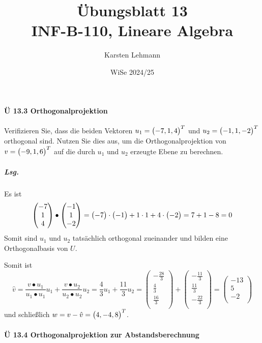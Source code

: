 \documentclass{scrreprt}
\author{Karsten Lehmann}
\date{WiSe 2024/25}
\title{Übungsblatt 13\\INF-B-110, Lineare Algebra}
\begin{document}
\paragraph{Ü 13.3 Orthogonalprojektion}

Verifizieren Sie, dass die beiden Vektoren
$u_1 = \qty\big(-7, 1, 4)^T$ und $u_2 = \qty\big(-1, 1, -2)^T$
orthogonal sind.
Nutzen Sie dies aus, um die Orthogonalprojektion von $v = \qty\big(-9, 1, 6)^T$
auf die durch $u_1$ und $u_2$ erzeugte Ebene zu berechnen.

\subparagraph{Lsg.} Es ist
\[
  \begin{pmatrix}
    -7 \\
    1  \\
    4  \\
  \end{pmatrix} \bullet \begin{pmatrix}
    -1 \\
    1  \\
    -2 \\
  \end{pmatrix} =
  \qty\big(-7) \cdot \qty\big(-1) + 1 \cdot 1 + 4 \cdot \qty\big(-2)
  = 7 + 1 - 8
  = 0
\]
Somit sind $u_1$ und $u_2$ tatsächlich orthogonal zueinander und bilden
eine Orthogonalbasis von $U$.

Somit ist
\[
  \hat{v}
  = \frac{v \bullet u_1}{u_1 \bullet u_1}u_1 + \frac{v \bullet u_2}{u_2 \bullet u_2}u_2
  = \frac{4}{3}u_1 + \frac{11}{3}u_2
  = \begin{pmatrix}
    -\frac{28}{3} \\
    \frac{4}{3}   \\
    \frac{16}{3}  \\
  \end{pmatrix} + \begin{pmatrix}
    -\frac{11}{3} \\
    \frac{11}{3}  \\
    -\frac{22}{3} \\
  \end{pmatrix} = \begin{pmatrix}
    -13 \\
    5   \\
    -2  \\
  \end{pmatrix}
\]
und schließlich $w = v - \hat{v} = \qty\big(4, -4, 8)^T$.

\paragraph{Ü 13.4 Orthogonalprojektion zur Abstandsberechnung}
\end{document}
